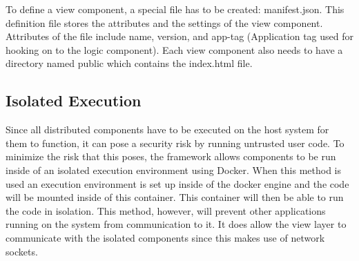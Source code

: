 To define a view component, a special file has to be created: manifest.json. This definition file stores the attributes and the settings of the view component. Attributes of the file include name, version, and app-tag (Application tag used for hooking on to the logic component). Each view component also needs to have a directory named public which contains the index.html file. 



\subsection{Isolated Execution}

Since all distributed components have to be executed on the host system for them to function, it can pose a security risk by running untrusted user code. To minimize the risk that this poses, the framework allows components to be run inside of an isolated execution environment using Docker. When this method is used an execution environment is set up inside of the docker engine and the code will be mounted inside of this container. This container will then be able to run the code in isolation. This method, however, will prevent other applications running on the system from communication to it. It does allow the view layer to communicate with the isolated components since this makes use of network sockets.